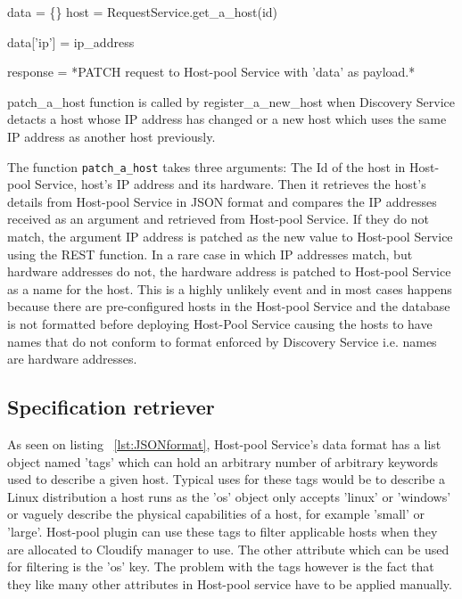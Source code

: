 \begin{algorithm}[H]
\label{fig:patch}
\setlength{\AlCapSkip}{1em}
\begin{center}
\end{center}

data = \{\}\;
host = RequestService.get\_a\_host(id)\;

 {
	data['ip'] = ip\_address\;
} 

response = *PATCH request to Host-pool Service with 'data' as payload.*\;

\caption{patch\_a\_host function is called by register\_a\_new\_host when Discovery Service detacts a host whose IP address has changed or a new host which uses the same IP address as another host previously.}

\end{algorithm}
\vspace*{1em}

The function \verb|patch_a_host| takes three arguments: The Id of the host in Host-pool Service, host's IP address and its hardware. Then it retrieves the host's details from Host-pool Service in JSON format and compares the IP addresses received as an argument and retrieved from Host-pool Service. If they do not match, the argument IP address is patched as the new value to Host-pool Service using the REST function. In a rare case in which IP addresses match, but hardware addresses do not, the hardware address is patched to Host-pool Service as a name for the host. This is a highly unlikely event and in most cases happens because there are pre-configured hosts in the Host-pool Service and the database is not formatted before deploying Host-Pool Service causing the hosts to have names that do not conform to format enforced by Discovery Service i.e. names are hardware addresses.

\subsection{Specification retriever}

As seen on listing ~\ref{lst:JSONformat}, Host-pool Service's data format has a list object named 'tags' which can hold an arbitrary number of arbitrary keywords used to describe a given host. Typical uses for these tags would be to describe a Linux distribution a host runs as the 'os' object only accepts 'linux' or 'windows' or vaguely describe the physical capabilities of a host, for example 'small' or 'large'. Host-pool plugin can use these tags to filter applicable hosts when they are allocated to Cloudify manager to use. The other attribute which can be used for filtering is the 'os' key. The problem with the tags however is the fact that they like many other attributes in Host-pool service have to be applied manually.

